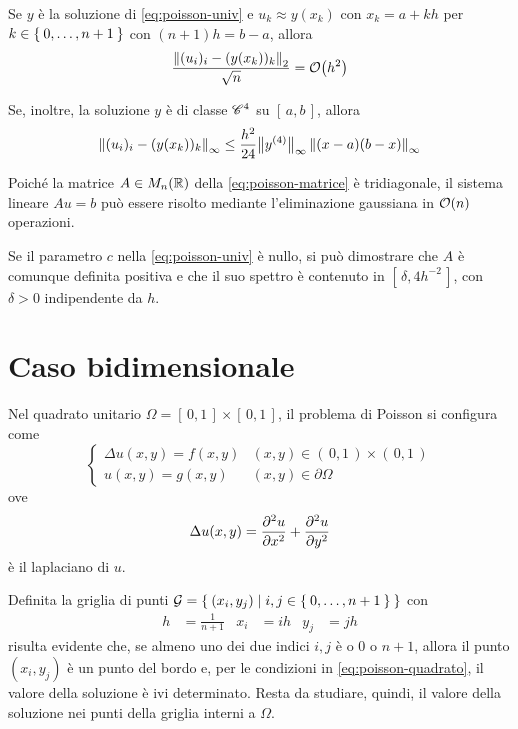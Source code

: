 	\begin{teorema}
		Se \(y\) è la soluzione di \eqref{eq:poisson-univ} e \(u_k \approx y (x_k)\) con \(x_k = a + k h\) per \(k \in \Set{0, \dots, n + 1}\) con \((n + 1) h = b - a\), allora
		\begin{equation}
			\frac{\norm{(u_i)_i - (y (x_k))_k}_2}{\sqrt{n}} = \order{h^2}
		\end{equation}
	
		Se, inoltre, la soluzione \(y\) è di classe \(\mathscr{C}^4\) su \([\, a, b \,]\), allora
		\begin{equation}
			\norm{(u_i)_i - (y (x_k))_k}_\infty \le \frac{h^2}{24} \bigl\| y^{(4)} \bigr\|_\infty \, \norm{(x - a) (b - x)}_\infty
		\end{equation}
	\end{teorema}

	\begin{osservazione}
		Poiché la matrice \(A \in M_n (\mathbb{R})\) della \eqref{eq:poisson-matrice} è tridiagonale, il sistema lineare \(A u = b\) può essere risolto mediante l'eliminazione gaussiana in \(\order{n}\) operazioni.
		
		Se il parametro \(c\) nella \eqref{eq:poisson-univ} è nullo, si può dimostrare che \(A\) è comunque definita positiva e che il suo spettro è contenuto in \([\, \delta, 4 h^{-2} \,]\), con \(\delta > 0\) indipendente da \(h\).
	\end{osservazione}

\section{Caso bidimensionale}
	
	\noindent Nel quadrato unitario  \(\varOmega = [\, 0, 1 \,] \times [\, 0, 1 \,]\), il problema di Poisson si configura come
	\begin{equation}\label{eq:poisson-quadrato}
		\begin{cases}
			\Delta u (x, y) = f (x, y) & (x, y) \in (\, 0, 1 \,) \times (\, 0, 1 \,) \\
			u (x, y) = g (x, y) & (x, y) \in \partial \varOmega
		\end{cases}
	\end{equation}
	ove
	\begin{equation*}
		\Delta u (x, y) = \pdv[2]{u}{x} + \pdv[2]{u}{y}
	\end{equation*}
	è il laplaciano di \(u\).
	
	Definita la griglia di punti \(\mathcal{G} = \Set{(x_i, y_j) | i, j \in \Set{0, \dots, n + 1}}\) con
	\begin{align*}
		h &= \frac{1}{n + 1} &
		x_i &= i h &
		y_j &= j h
	\end{align*}
	risulta evidente che, se almeno uno dei due indici \(i, j\) è o \(0\) o \(n + 1\), allora il punto \((x_i, y_j)\) è un punto del bordo e, per le condizioni in \eqref{eq:poisson-quadrato}, il valore della soluzione è ivi determinato. Resta da studiare, quindi, il valore della soluzione nei punti della griglia interni a \(\varOmega\).
	
